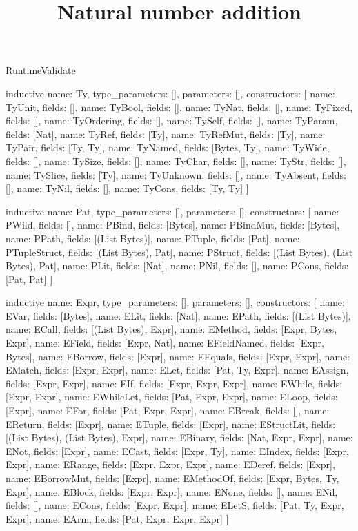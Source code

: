 \begin{lexlean}{RuntimeValidate}
\title{Natural number addition}
\begin{semanticmodule}
inductive{
  name: Ty,
  type_parameters: [],
  parameters: [],
  constructors: [
    {name: TyUnit, fields: []},
    {name: TyBool, fields: []},
    {name: TyNat, fields: []},
    {name: TyFixed, fields: []},
    {name: TyOrdering, fields: []},
    {name: TySelf, fields: []},
    {name: TyParam, fields: [Nat]},
    {name: TyRef, fields: [Ty]},
    {name: TyRefMut, fields: [Ty]},
    {name: TyPair, fields: [Ty, Ty]},
    {name: TyNamed, fields: [Bytes, Ty]},
    {name: TyWide, fields: []},
    {name: TySize, fields: []},
    {name: TyChar, fields: []},
    {name: TyStr, fields: []},
    {name: TySlice, fields: [Ty]},
    {name: TyUnknown, fields: []},
    {name: TyAbsent, fields: []},
    {name: TyNil, fields: []},
    {name: TyCons, fields: [Ty, Ty]}
  ]
}

inductive{
  name: Pat,
  type_parameters: [],
  parameters: [],
  constructors: [
    {name: PWild, fields: []},
    {name: PBind, fields: [Bytes]},
    {name: PBindMut, fields: [Bytes]},
    {name: PPath, fields: [(List Bytes)]},
    {name: PTuple, fields: [Pat]},
    {name: PTupleStruct, fields: [(List Bytes), Pat]},
    {name: PStruct, fields: [(List Bytes), (List Bytes), Pat]},
    {name: PLit, fields: [Nat]},
    {name: PNil, fields: []},
    {name: PCons, fields: [Pat, Pat]}
  ]
}

inductive{
  name: Expr,
  type_parameters: [],
  parameters: [],
  constructors: [
    {name: EVar, fields: [Bytes]},
    {name: ELit, fields: [Nat]},
    {name: EPath, fields: [(List Bytes)]},
    {name: ECall, fields: [(List Bytes), Expr]},
    {name: EMethod, fields: [Expr, Bytes, Expr]},
    {name: EField, fields: [Expr, Nat]},
    {name: EFieldNamed, fields: [Expr, Bytes]},
    {name: EBorrow, fields: [Expr]},
    {name: EEquals, fields: [Expr, Expr]},
    {name: EMatch, fields: [Expr, Expr]},
    {name: ELet, fields: [Pat, Ty, Expr]},
    {name: EAssign, fields: [Expr, Expr]},
    {name: EIf, fields: [Expr, Expr, Expr]},
    {name: EWhile, fields: [Expr, Expr]},
    {name: EWhileLet, fields: [Pat, Expr, Expr]},
    {name: ELoop, fields: [Expr]},
    {name: EFor, fields: [Pat, Expr, Expr]},
    {name: EBreak, fields: []},
    {name: EReturn, fields: [Expr]},
    {name: ETuple, fields: [Expr]},
    {name: EStructLit, fields: [(List Bytes), (List Bytes), Expr]},
    {name: EBinary, fields: [Nat, Expr, Expr]},
    {name: ENot, fields: [Expr]},
    {name: ECast, fields: [Expr, Ty]},
    {name: EIndex, fields: [Expr, Expr]},
    {name: ERange, fields: [Expr, Expr, Expr]},
    {name: EDeref, fields: [Expr]},
    {name: EBorrowMut, fields: [Expr]},
    {name: EMethodOf, fields: [Expr, Bytes, Ty, Expr]},
    {name: EBlock, fields: [Expr, Expr]},
    {name: ENone, fields: []},
    {name: ENil, fields: []},
    {name: ECons, fields: [Expr, Expr]},
    {name: ELetS, fields: [Pat, Ty, Expr, Expr]},
    {name: EArm, fields: [Pat, Expr, Expr, Expr]}
  ]
}


\end{semanticmodule}
\end{lexlean}
